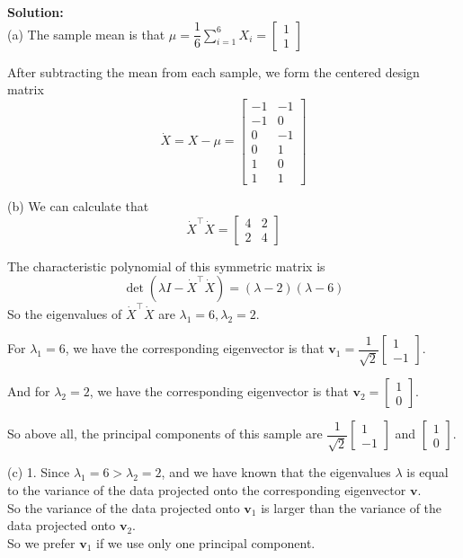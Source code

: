 \documentclass[10pt]{article}
\begin{document}
\begin{enumerate}[1.]
\textbf{Solution:}\\
(a) The sample mean is that $\mu=\dfrac{1}{6}\sum\limits_{i=1}^6 X_i=\left[\begin{array}{l}
  1 \\
  1
  \end{array}\right]$

After subtracting the mean from each sample, we form the centered design matrix
$$\dot{X}=X-\mu=
\begin{bmatrix}
  -1 & -1 \\
  -1 & 0 \\
  0 & -1 \\
  0 & 1 \\
  1 & 0 \\
  1 & 1 
\end{bmatrix}
$$

(b) We can calculate that
$$\dot{X}^{\top} \dot{X}=
\begin{bmatrix}
  4 & 2 \\
  2 & 4
\end{bmatrix}$$

The characteristic polynomial of this symmetric matrix is
$$\det(\lambda I - \dot{X}^{\top} \dot{X})=(\lambda-2)(\lambda-6)$$
So the eigenvalues of $\dot{X}^{\top} \dot{X}$ are $\lambda_1=6, \lambda_2=2$.

For $\lambda_1=6$, we have the corresponding eigenvector is that $\mathbf{v}_1=
\dfrac{1}{\sqrt{2}}\begin{bmatrix}
  1 \\
  -1
\end{bmatrix}$.

And for $\lambda_2=2$, we have the corresponding eigenvector is that $\mathbf{v}_2=
\begin{bmatrix}
  1 \\
  0
\end{bmatrix}$.

So above all, the principal components of this sample are 
$\dfrac{1}{\sqrt{2}}\begin{bmatrix}
  1 \\
  -1
\end{bmatrix}$ and $\begin{bmatrix}
  1 \\
  0
\end{bmatrix}$.

(c) 1. Since $\lambda_1=6>\lambda_2=2$, and we have known that the eigenvalues $\lambda$ is 
equal to the variance of the data projected onto the corresponding eigenvector $\mathbf{v}$.\\
So the variance of the data projected onto $\mathbf{v}_1$ is larger than the variance of the data projected onto $\mathbf{v}_2$.\\
So we prefer $\mathbf{v}_1$ if we use only one principal component.\\


\end{enumerate}
\end{document}
